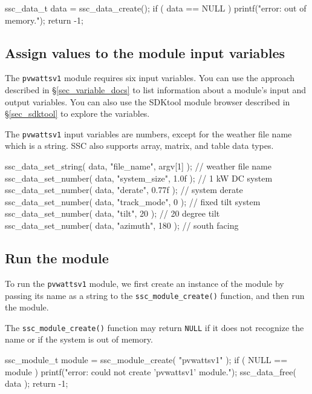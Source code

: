 \documentclass{scrartcl} %
\begin{document}
\begin{verbatimtab}[4]
	ssc_data_t data = ssc_data_create();
	if ( data == NULL )
	{
		printf("error: out of memory.\n");
		return -1;
	}
\end{verbatimtab}

\subsection{Assign values to the module input variables}

The \texttt{pvwattsv1} module requires six input variables. You can use the approach described in \S\ref{sec_variable_docs} to list information about a module's input and output variables. You can also use the SDKtool module browser described in \S\ref{sec_sdktool} to explore the variables.

The \texttt{pvwattsv1} input variables are numbers, except for the weather file name which is a string. SSC also supports array, matrix, and table data types.

\begin{verbatimtab}[4]
	ssc_data_set_string( data, "file_name", argv[1] ); // weather file name
	ssc_data_set_number( data, "system_size", 1.0f );  // 1 kW DC system
	ssc_data_set_number( data, "derate", 0.77f );      // system derate
	ssc_data_set_number( data, "track_mode", 0 );      // fixed tilt system
	ssc_data_set_number( data, "tilt", 20 );           // 20 degree tilt
	ssc_data_set_number( data, "azimuth", 180 );       // south facing
\end{verbatimtab}

\subsection{Run the module}
\label{sec_run_module}

To run the \texttt{pvwattsv1} module, we first create an instance of the module by passing its name as a string to the \texttt{ssc\_module\_create()} function, and then run the module. 

The \texttt{ssc\_module\_create()} function may return \texttt{NULL} if it does not recognize the name or if the system is out of memory.

\begin{verbatimtab}[4]
	ssc_module_t module = ssc_module_create( "pvwattsv1" );
	if ( NULL == module )
	{
		printf("error: could not create 'pvwattsv1' module.\n");
		ssc_data_free( data );
		return -1;
	}
\end{verbatimtab}
\end{document}
